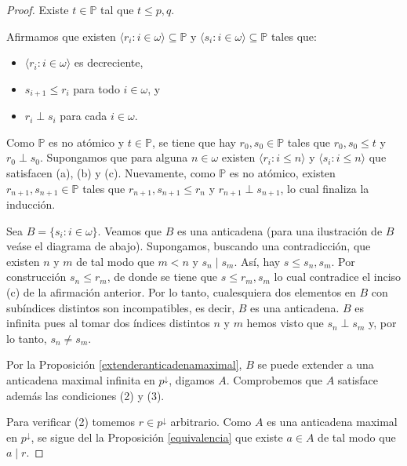 \documentclass[11pt]{unam_tesis1}
\theoremstyle{MyThmStyle}
\theoremstyle{definition}
\theoremstyle{plain}
\theoremstyle{remark}
\let\leq\leqslant
\begin{document}
\begin{proof}
Existe $t\in \mathbb P$ tal que $t\leq p,q$.

Afirmamos que existen $\langle r_{i}:i\in \omega \rangle\subseteq \mathbb P$ y $\langle s_{i}:i\in \omega \rangle\subseteq \mathbb P$ tales que:

\begin{itemize}
\item [(a)] $\langle r_i : i\in \omega \rangle$ es decreciente,
\item [(b)]$s_{i+1}\leq r_i$ para todo $i\in \omega$, y
\item [(c)]$r_i\perp s_i$ para cada $i\in \omega$.
\end{itemize}

Como $\mathbb P$ es no at\'omico y $t\in \mathbb P$, se tiene que hay $r_0,s_0\in \mathbb P$ tales que $r_0,s_0\leq t$ y $r_0\perp s_0$.
Supongamos que para alguna $n\in \omega$ existen $\langle r_{i}:i\leq n \rangle$ y $\langle s_{i}:i\leq n \rangle$ que satisfacen (a), (b) y (c). Nuevamente, como $\mathbb P$ es no at\'omico, existen $r_{n+1}, s_{n+1}\in  \mathbb P$ tales que $r_{n+1}, s_{n+1}\leq r_n$ y $r_{n+1}\perp s_{n+1}$, lo cual finaliza la inducci\'on.

Sea $B=\{s_{i}: i\in \omega \}$. Veamos que $B$ es una anticadena (para una ilustraci\'on de $B$ ve\'ase el diagrama de abajo). Supongamos, buscando una contradicci\'on, que existen $n$ y $m$ de tal modo que $m<n$ y $s_n\mid s_m$. As\'i, hay $s\leq s_n,s_m$. Por construcci\'on $s_n\leq r_m$, de donde se tiene que $s\leq r_m, s_m$ lo cual contradice el inciso (c) de la afirmaci\'on anterior. Por lo tanto, cualesquiera dos elementos en $B$ con sub\'indices distintos son incompatibles, es decir, $B$ es una anticadena. $B$ es infinita pues al tomar dos \'indices distintos $n$ y $m$ hemos visto que $s_n\perp s_m$ y, por lo tanto, $s_n\neq s_m$.

Por la Proposici\'on \ref{extenderanticadenamaximal}, $B$ se puede extender a una anticadena maximal infinita en $p^{\downarrow}$, digamos $A$. Comprobemos que $A$ satisface adem\'as las condiciones (2) y (3).

Para verificar (2) tomemos $r\in p^{\downarrow}$ arbitrario. Como $A$ es una anticadena maximal en $p^{\downarrow}$, se sigue del la Proposici\'on \ref{equivalencia} que existe $a\in A$ de tal modo que $a\mid r$.




\end{proof}
\end{document}
